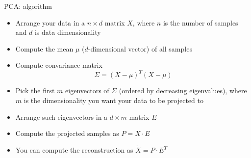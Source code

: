 \begin{frame}{PCA: algorithm}
\begin{itemize}
\item Arrange your data in a $n\times d$ matrix $X$, where $n$ is the number of samples and $d$ is data dimensionality
\item Compute the mean $\mu$ ($d$-dimensional vector) of all samples
\item Compute convariance matrix
\begin{equation*}
\Sigma = (X-\mu)^T(X-\mu)
\end{equation*}
\item Pick the first $m$ eigenvectors of $\Sigma$ (ordered by decreasing eigenvalues), where $m$ is the dimensionality you want your data to be projected to
\item Arrange such eigenvectors in a $d\times m$ matrix $E$
\item Compute the projected samples as $P=X\cdot E$
\item You can compute the reconstruction as $\tilde{X} = P\cdot E^T$
\end{itemize}
\end{frame}